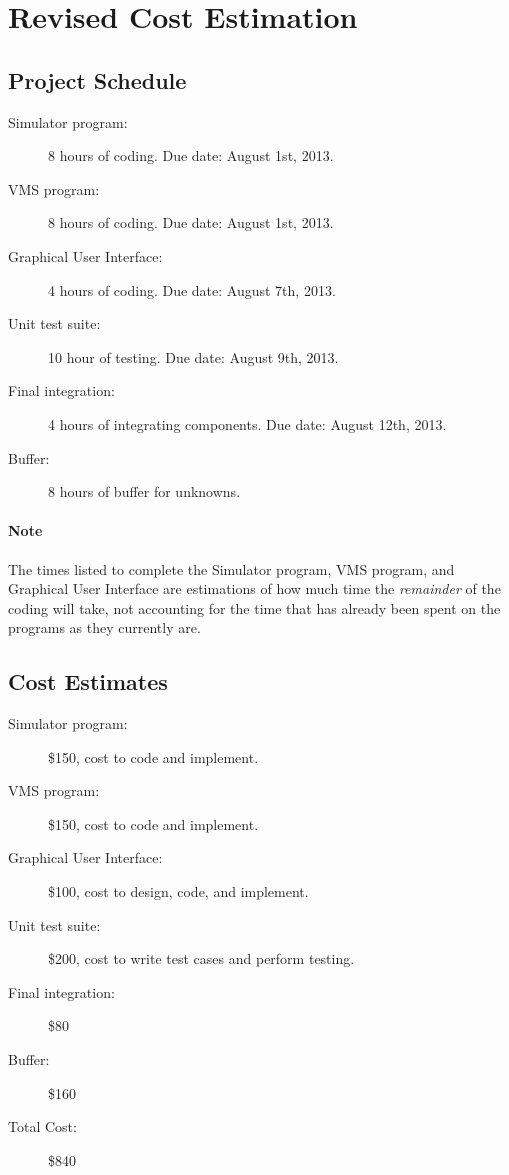 \documentclass{article}
\begin{document}
\break

\section{Revised Cost Estimation} %


\subsection{Project Schedule}

\begin{description}
  \item[Simulator program:] 8 hours of coding. Due date: August 1st, 2013.
  \item[VMS program:] 8 hours of coding. Due date: August 1st, 2013.
  \item[Graphical User Interface:] 4 hours of coding. Due date: August 7th, 2013.
  \item[Unit test suite:] 10 hour of testing. Due date: August 9th, 2013.
  \item[Final integration:] 4 hours of integrating components. Due date: August 12th, 2013.
  \item[Buffer:] 8 hours of buffer for unknowns.
\end{description}

\paragraph{Note}
The times listed to complete the Simulator program, VMS program, and Graphical User Interface are estimations of how much time the \emph{remainder} of the coding will take, not accounting for the time that has already been spent on the programs as they currently are.

\subsection{Cost Estimates}

\begin{description}
  \item[Simulator program:] \$150, cost to code and implement.
  \item[VMS program:] \$150, cost to code and implement.
  \item[Graphical User Interface:] \$100, cost to design, code, and implement.
  \item[Unit test suite:] \$200, cost to write test cases and perform testing.
  \item[Final integration:] \$80
  \item[Buffer:] \$160
  \item[Total Cost:] \$840
\end{description}
\end{document}
